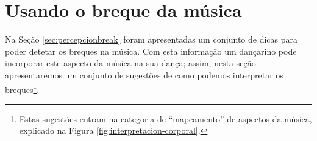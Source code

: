 

\clearpage
\section{Usando o breque da música}
\label{sec:UsandoBreak}

Na Seção \ref{sec:percepcionbreak} foram apresentadas um conjunto de dicas 
para poder detetar os breques na música.
Com esta informação um dançarino pode incorporar este aspecto da música na sua dança;
assim, nesta seção apresentaremos um conjunto de sugestões  
de como podemos interpretar os breques\footnote{Estas 
sugestões entram na categoria de ``mapeamento'' de aspectos da música, 
explicado na Figura \ref{fig:interpretacion-corporal}.}.


